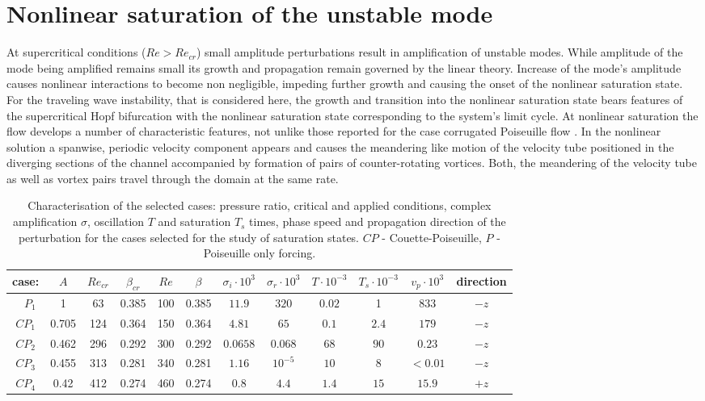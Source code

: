 \documentclass[lineno]{jfm}
\begin{document}
\section{Nonlinear saturation of the unstable mode}
\label{sec:nonlinear_saturation}
At supercritical conditions ($Re>Re_{cr}$) small amplitude perturbations result in amplification of unstable modes.
While amplitude of the mode being amplified remains small its growth and propagation remain governed by the linear theory.
Increase of the mode's amplitude causes nonlinear interactions to become non negligible,
impeding further growth and causing the onset of the nonlinear saturation state.
For the traveling wave instability, that is considered here, the growth and transition into the nonlinear saturation state bears features of the supercritical Hopf bifurcation \citep{Nikesh2018} with the nonlinear saturation state corresponding to the system's limit cycle.
At nonlinear saturation the flow develops a number of characteristic features,
not unlike those reported for the case corrugated Poiseuille flow \citep{Nikesh2017}.
In the nonlinear solution a spanwise, periodic velocity component appears and causes the meandering like motion of the velocity tube positioned in the diverging sections of the channel accompanied by formation of pairs of counter-rotating vortices.
Both, the meandering of the velocity tube as well as vortex pairs travel through the domain at the same rate.

\begin{table}
    \centering
    \begin{tabular}{|c||c|cc||cc|cc|cc|cc|}
     \hline
    case:  & $A$ & $Re_{cr}$ & $\beta_{cr}$ & $Re$ & $\beta$ & $\sigma_i\cdot10^{3}$ & $\sigma_r\cdot10^{3}$ & $T\cdot10^{-3}$ & $T_s\cdot10^{-3}$ & $v_p\cdot10^{3}$ & direction\\ \hline
 \hline
    ~ $P_1$   & 1 & 63 & 0.385 & 100 & 0.385 & $11.9$ & $320$ & $0.02$ &1 & $833$ & $-z$ \\ 
           \hline
    $CP_1$  & 0.705 & 124 & 0.364  & 150  & 0.364 & $4.81$ & $65$  & $0.1$ & $2.4$ & $179$ & $-z$\\
    $CP_2$   & 0.462 & 296 & 0.292& 300 & 0.292 & $0.0658$ & $0.068$ &$68$ &$90$ & $0.23$ & $-z$\\
    $CP_3$   & 0.455 & 313 & 0.281 & 340 & 0.281 & $1.16$ &$10^{-5}$ & $10$ & $8$ & $<0.01$ & $-z$ \\
    $CP_4$   & 0.42 & 412 & 0.274 & 460 & 0.274 & $0.8$ & $4.4$ & $1.4$ & $15$ & $15.9$ & $+z$ \\
 \hline
    \end{tabular}
    \caption{Characterisation of the selected cases: pressure ratio, critical and applied conditions, complex amplification $\sigma$, oscillation $T$ and saturation $T_s$ times, phase speed and propagation direction of the perturbation for the cases selected for the study of saturation states. $CP$ - Couette-Poiseuille, $P$ - Poiseuille only forcing.}
    \label{tab:cases}
\end{table}
\end{document}

